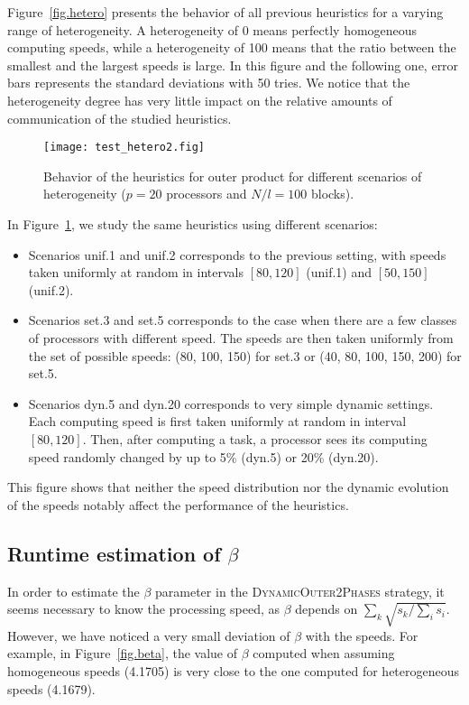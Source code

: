 \documentclass[a4paper,10pt]{article}
\newcommand{\stupidthreshold}{\textsc{Dynamic\-Outer\-2Phases}\xspace}
\begin{document}
Figure~\ref{fig.hetero} presents the behavior of all previous
heuristics for a varying range of heterogeneity. A heterogeneity of 0
means perfectly homogeneous computing speeds, while a heterogeneity of
100 means that the ratio between the smallest and the largest speeds
is large. In this figure and the following one, error bars represents
the standard deviations with 50 tries. We notice that the
heterogeneity degree has very little impact on the relative amounts of
communication of the studied heuristics.

\begin{figure}[htbp]
  \centering
  \texttt{[image: test\_hetero2.fig]}
  \caption{Behavior of the heuristics for outer product for different scenarios
    of heterogeneity ($p=20$ processors and $N/l=100$ blocks).}
  \label{fig.hetero2}
\end{figure}

In Figure~\ref{fig.hetero2}, we study the same heuristics using
different scenarios:
\begin{itemize}
\item Scenarios unif.1 and unif.2 corresponds to the previous setting,
  with speeds taken uniformly at random in intervals $[80,120]$
  (unif.1) and $[50,150]$ (unif.2).
\item Scenarios set.3 and set.5 corresponds to the case when there are
  a few classes of processors with different speed. The speeds are
  then taken uniformly from the set of possible speeds: (80, 100, 150)
  for set.3 or (40, 80, 100, 150, 200) for set.5.
\item Scenarios dyn.5 and dyn.20 corresponds to very simple dynamic
  settings. Each computing speed is first taken uniformly at random in
  interval $[80,120]$. Then, after computing a task, a processor sees
  its computing speed randomly changed by up to 5\% (dyn.5) or 20\%
  (dyn.20). 
\end{itemize}
This figure shows that neither the speed distribution nor the dynamic
evolution of the speeds notably affect the performance of the
heuristics.




\subsection{Runtime estimation of $\beta$}
\label{betaestimation}

In order to estimate the $\beta$ parameter in the \stupidthreshold
strategy, it seems necessary to know the processing speed, as $\beta$
depends on $\sum_k \sqrt{{s_k}/{\sum_i s_i}}$. However, we have
noticed a very small deviation of $\beta$ with the speeds. For
example, in Figure~\ref{fig.beta}, the value of $\beta$ computed when
assuming homogeneous speeds (4.1705) is very close to the one computed
for heterogeneous speeds (4.1679). 
\end{document}
